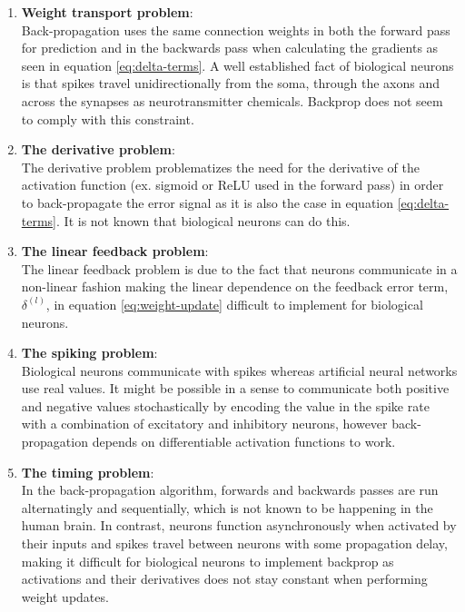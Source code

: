\documentclass[a4paper,11pt]{article}
\begin{document}
\begin{enumerate}
  \item \textbf{Weight transport problem}: \vspace{5pt} \\
  Back-propagation uses the same connection weights in both the forward pass for prediction and in the backwards pass when calculating the gradients as seen in equation \ref{eq:delta-terms}. A well established fact of biological neurons is that spikes travel unidirectionally from the soma, through the axons and across the synapses as neurotransmitter chemicals. Backprop does not seem to comply with this constraint. 
  \item \textbf{The derivative problem}: \vspace{5pt} \\
  The derivative problem problematizes the need for the derivative of the activation function (ex. sigmoid or ReLU used in the forward pass) in order to back-propagate the error signal as it is also the case in equation \ref{eq:delta-terms}. It is not known that biological neurons can do this.
  \item \textbf{The linear feedback problem}: \vspace{5pt} \\
  The linear feedback problem is due to the fact that neurons communicate in a non-linear fashion making the linear dependence on the feedback error term, $\delta^{(l)}$, in equation \ref{eq:weight-update} difficult to implement for biological neurons. 
  \item \textbf{The spiking problem}: \vspace{5pt} \\
  Biological neurons communicate with spikes whereas artificial neural networks use real values. It might be possible in a sense to communicate both positive and negative values stochastically by encoding the value in the spike rate with a combination of excitatory and inhibitory neurons, however back-propagation depends on differentiable activation functions to work. %
  \item \textbf{The timing problem}: \vspace{5pt} \\
  In the back-propagation algorithm, forwards and backwards passes are run alternatingly and sequentially, which is not known to be happening in the human brain. In contrast, neurons function asynchronously when activated by their inputs and spikes travel between neurons with some propagation delay, making it difficult for biological neurons to implement backprop as activations and their derivatives does not stay constant when performing weight updates. 

\end{enumerate}
\end{document}
